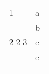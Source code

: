 \documentclass{article}
\begin{document}
\begin{tabular}{|l|l|}\hline
1 & a\\\arrayrulecolor{red}\hline
2 & b\\\cline{2-2}
3 & c\\\arrayrulecolor[rgb]{0,0,1}\hline
\multicolumn{1}{|c|}{d} & e\\\arrayrulecolor{black}\hline
\end{tabular}
\end{document}
